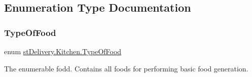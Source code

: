 \subsection{Enumeration Type Documentation}
\mbox{\label{namespacest_delivery_1_1_kitchen_a7c971dd83dd8457a7495309917619132}} 
\subsubsection{\texorpdfstring{Type\+Of\+Food}{TypeOfFood}}
{\footnotesize\ttfamily enum \hyperlink{namespacest_delivery_1_1_kitchen_a7c971dd83dd8457a7495309917619132}{st\+Delivery.\+Kitchen.\+Type\+Of\+Food}\hspace{0.3cm}{\ttfamily [strong]}}



The enumerable fodd. Contains all foods for performing basic food generation. 

